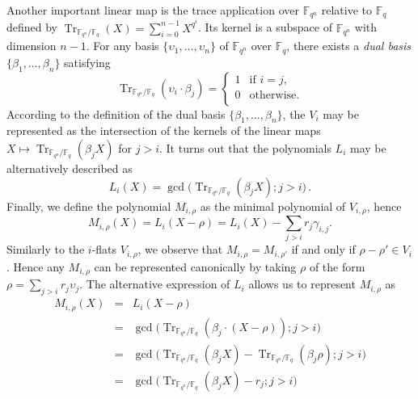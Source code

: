 \documentclass{article}
\newcommand{\ff}[1]{\mathbb{F}_{#1}}
\newcommand{\qq}{q}
\newcommand{\nn}{n}
\newcommand{\qn}{{\qq^\nn}}
\newcommand{\basef}{\ff{\qq}}
\newcommand{\extf}{\ff{\qn}}
\DeclareMathOperator{\Tr}{Tr}
\DeclareMathOperator{\Ker}{Ker}
\begin{document}
Another important linear map is the trace application over $\extf$ relative to $\basef$ defined by $\Tr_{\extf/\basef}(X)=\sum_{i=0}^{n-1} X^{\qq^i}$. Its kernel is a subspace of $\extf$ with dimension $n-1$. For any basis $\{\upsilon_1,\ldots,\upsilon_\nn\}$ of $\extf$ over $\basef$, there exists a \emph{dual basis} $\{\beta_1,\ldots,\beta_\nn\}$ satisfying  
$$
\Tr_{\extf/\basef}(\upsilon_i \cdot \beta_j)=
\left\{
\begin{array}{ll}
1 & \mbox{if } i=j, \\
0 &  \mbox{otherwise}. \\
\end{array}
\right.
$$
According to the definition of the dual  basis $\{\beta_1,\ldots,\beta_\nn\}$, the $V_i$ may be represented as 
the intersection of the kernels of the linear maps $X \mapsto \Tr_{\extf/\basef}(\beta_j X )$ for $j>i$. It turns out that the polynomials 
 $L_i$ may be alternatively described as
 \begin{equation}
 \label{L_i_alt_formula}
 L_i(X)=\gcd\bigl(\Tr_{\extf/\basef}(\beta_j X );j>i\bigr) \,.
 \end{equation}
Finally, we define the polynomial $M_{i,\rho}$ as the minimal
polynomial of $V_{i,\rho}$, hence
\begin{equation}
  M_{i,\rho}(X) = L_i(X - \rho) = L_i(X) - \sum_{j>i}r_j\gamma_{i,j}.
\end{equation}
Similarly to the $i$-flats $V_{i,\rho}$, we observe that $M_{i,\rho}=M_{i,\rho'}$ if and only if $\rho-\rho'\in V_i$. Hence
any $M_{i,\rho}$ can be represented canonically by taking $\rho$ of
the form $\rho=\sum_{j>i}r_j\upsilon_j$. The alternative expression of $L_i$ allows us to represent $M_{i,\rho}$ as
\begin{equation}
\label{alternative_M_i_rho}
\begin{array}{lll}
M_{i,\rho}(X)&=& L_i(X-\rho) \\
&=&\gcd\bigl(\Tr_{\extf/\basef}(\beta_j \cdot  (X-\rho) );j>i\bigr)  \\
&=& \gcd\bigl(\Tr_{\extf/\basef}(\beta_j X) -\Tr_{\extf/\basef}(\beta_j \rho) ;j>i\bigr)  \\
&=&  \gcd\bigl(\Tr_{\extf/\basef}(\beta_j X) -r_j ;j>i\bigr)  \\
\end{array}
\end{equation}
\end{document}
